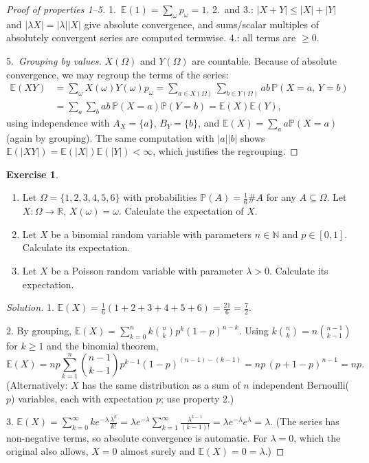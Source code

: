 \documentclass[11pt,a4paper]{article}
\numberwithin{equation}{section}
\newcommand{\N}{\mathbb{N}}
\newcommand{\R}{\mathbb{R}}
\newcommand{\PP}{\mathbb{P}}
\newcommand{\E}{\mathbb{E}}
\theoremstyle{plain}
\theoremstyle{definition}
\newtheorem{exercise}[theorem]{Exercise}
\theoremstyle{plain}
\theoremstyle{definition}
\newenvironment{solution}{\begin{proof}[Solution]}{\end{proof}}
\begin{document}
\begin{proof}[Proof of properties 1--5]
1.\ $\E(1)=\sum_\omega p_\omega=1$. 2.\ and 3.: $|X+Y|\le|X|+|Y|$ and $|\lambda X|=|\lambda||X|$
give absolute convergence, and sums/scalar multiples of absolutely convergent series are
computed termwise. 4.: all terms are $\ge0$.

5.\ \emph{Grouping by values.} $X(\Omega)$ and $Y(\Omega)$ are countable. Because of
absolute convergence, we may regroup the terms of the series:
\begin{align*}
\E(XY)&=\sum_{\omega}X(\omega)Y(\omega)p_\omega
=\sum_{a\in X(\Omega)}\sum_{b\in Y(\Omega)}ab\,\PP(X=a,\,Y=b)\\
&=\sum_{a}\sum_{b}ab\,\PP(X=a)\PP(Y=b)=\E(X)\E(Y),
\end{align*}
using independence with $A_X=\{a\}$, $B_Y=\{b\}$, and $\E(X)=\sum_aa\PP(X=a)$ (again by
grouping). The same computation with $|a||b|$ shows $\E(|XY|)=\E(|X|)\E(|Y|)<\infty$, which
justifies the regrouping.
\end{proof}

\begin{exercise}
\begin{enumerate}
\item Let $\Omega=\{1,2,3,4,5,6\}$ with probabilities $\PP(A)=\frac16\#A$ for any
$A\subseteq\Omega$. Let $X:\Omega\to\R$, $X(\omega)=\omega$. Calculate the expectation of $X$.
\item Let $X$ be a binomial random variable with parameters $n\in\N$ and $p\in[0,1]$.
Calculate its expectation.
\item Let $X$ be a Poisson random variable with parameter $\lambda>0$. Calculate its expectation.
\end{enumerate}
\end{exercise}
\begin{solution}
1. $\E(X)=\frac16(1+2+3+4+5+6)=\frac{21}6=\frac72$.

2. By grouping, $\E(X)=\sum_{k=0}^nk\binom nkp^k(1-p)^{n-k}$. Using
$k\binom nk=n\binom{n-1}{k-1}$ for $k\ge1$ and the binomial theorem,
\[
\E(X)=np\sum_{k=1}^n\binom{n-1}{k-1}p^{k-1}(1-p)^{(n-1)-(k-1)}=np\,(p+1-p)^{n-1}=np .
\]
(Alternatively: $X$ has the same distribution as a sum of $n$ independent Bernoulli($p$)
variables, each with expectation $p$; use property 2.)

3. $\E(X)=\sum_{k=0}^\infty ke^{-\lambda}\frac{\lambda^k}{k!}
=\lambda e^{-\lambda}\sum_{k=1}^\infty\frac{\lambda^{k-1}}{(k-1)!}=\lambda e^{-\lambda}e^\lambda=\lambda$.
(The series has non-negative terms, so absolute convergence is automatic. For $\lambda=0$,
which the original also allows, $X=0$ almost surely and $\E(X)=0=\lambda$.)
\end{solution}
\end{document}
